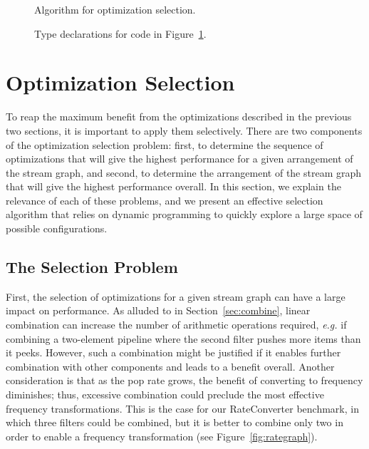 \begin{figure}[t]
  \caption{Algorithm for optimization selection.
  \protect\label{fig:part-alg}}
\end{figure}

\begin{figure}[t]
  \caption{Type declarations for code in Figure~\ref{fig:part-alg}.
  \protect\label{fig:part-decl}}
\end{figure}


\section{Optimization Selection}
\label{sec:partitioning}

To reap the maximum benefit from the optimizations described in the
previous two sections, it is important to apply them selectively.
There are two components of the optimization selection problem: first,
to determine the sequence of optimizations that will give the highest
performance for a given arrangement of the stream graph, and second,
to determine the arrangement of the stream graph that will give the
highest performance overall.  In this section, we explain the
relevance of each of these problems, and we present an effective
selection algorithm that relies on dynamic programming to quickly
explore a large space of possible configurations.

\subsection{The Selection Problem}

First, the selection of optimizations for a given stream graph can
have a large impact on performance.  As alluded to in
Section~\ref{sec:combine}, linear combination can increase the number
of arithmetic operations required, {\it e.g.} if combining a
two-element pipeline where the second filter pushes more items than it
peeks.  However, such a combination might be justified if it enables
further combination with other components and leads to a benefit
overall.  Another consideration is that as the pop rate grows,
the benefit of converting to frequency diminishes; thus, excessive combination
could preclude the most effective frequency transformations.  
This is the case for our
RateConverter benchmark, in which three filters could be combined, but
it is better to combine only two in order to enable a frequency
transformation (see Figure~\ref{fig:rategraph}).


